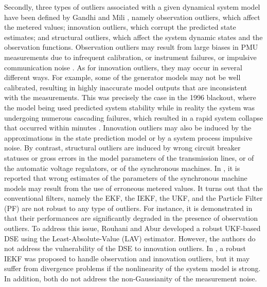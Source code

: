 \documentclass[10pt]{IEEEtran}
\begin{document}
Secondly, three types of outliers associated with a given dynamical system model have been defined by Gandhi and Mili \cite{Lmili2010}, namely observation outliers, which affect the metered values; innovation outliers, which corrupt the predicted state estimates; and structural outliers, which affect the system dynamic states and the observation functions. Observation outliers may result from large biases in PMU measurements due to infrequent calibration, or instrument failures, or impulsive communication noise \cite{Martin2007,KAThorp2015}. As for innovation outliers, they may occur in several different ways. For example, some of the generator models may not be well calibrated, resulting in highly inaccurate model outputs that are inconsistent with the measurements. This was precisely the case in the 1996 blackout, where the model being used predicted system stability while in reality the system was undergoing numerous cascading failures, which resulted in a rapid system collapse that occurred within minutes \cite{Kosterev1999,Kosterev2013}. Innovation outliers may also be induced by the approximations in the state prediction model or by a system process impulsive noise. By contrast, structural outliers are induced by wrong circuit breaker statuses or gross errors in the model parameters of the transmission lines, or of the automatic voltage regulators, or of the synchronous machines. In \cite{Pal2015_DSE}, it is reported that wrong estimates of the parameters of the synchronous machine models may result from the use of erroneous metered values. It turns out that the conventional filters, namely the EKF, the IEKF, the UKF, and the Particle Filter (PF) are not robust to any type of outliers. For instance, it is demonstrated in \cite{NZhou2015} that their performances are significantly degraded in the presence of observation outliers. To address this issue, Rouhani and Abur \cite{Rouhani2016} developed a robust UKF-based DSE using the Least-Absolute-Value (LAV) estimator. However, the authors do not address the vulnerability of the DSE to innovation outliers. In \cite{Junbo_GMIEKF2016}, a robust IEKF was proposed to handle observation and innovation outliers, but it may suffer from divergence problems if the nonlinearity of the system model is strong. In addition, both \cite{Rouhani2016,Junbo_GMIEKF2016} do not address the non-Gaussianity of the measurement noise.
\end{document}
